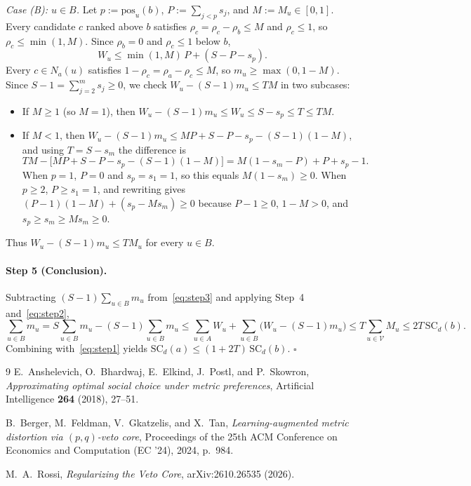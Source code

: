 \documentclass[11pt]{article}
\newcommand{\SC}{\mathrm{SC}}
\newcommand{\pos}{\mathrm{pos}}
\begin{document}
\emph{Case (B): $u \in B$.} Let $p := \pos_u(b)$, $P := \sum_{j < p} s_j$, and $M := M_u \in [0, 1]$. Every candidate $c$ ranked above $b$ satisfies $\rho_c = \rho_c - \rho_b \le M$ and $\rho_c \le 1$, so $\rho_c \le \min(1, M)$. Since $\rho_b = 0$ and $\rho_c \le 1$ below $b$,
\[
W_u \le \min(1, M)\,P + (S - P - s_p).
\]
Every $c \in N_a(u)$ satisfies $1 - \rho_c = \rho_a - \rho_c \le M$, so $m_u \ge \max(0, 1 - M)$. Since $S - 1 = \sum_{j=2}^m s_j \ge 0$, we check $W_u - (S - 1)m_u \le TM$ in two subcases:
\begin{itemize}
\item If $M \ge 1$ (so $M = 1$), then $W_u - (S - 1)m_u \le W_u \le S - s_p \le T \le TM$.
\item If $M < 1$, then $W_u - (S - 1)m_u \le MP + S - P - s_p - (S - 1)(1 - M)$, and using $T = S - s_m$ the difference is
\[
TM - \bigl[MP + S - P - s_p - (S - 1)(1 - M)\bigr] = M(1 - s_m - P) + P + s_p - 1.
\]
When $p = 1$, $P = 0$ and $s_p = s_1 = 1$, so this equals $M(1 - s_m) \ge 0$. When $p \ge 2$, $P \ge s_1 = 1$, and rewriting gives $(P - 1)(1 - M) + (s_p - Ms_m) \ge 0$ because $P - 1 \ge 0$, $1 - M > 0$, and $s_p \ge s_m \ge Ms_m \ge 0$.
\end{itemize}
Thus $W_u - (S - 1)m_u \le TM_u$ for every $u \in B$.

\paragraph{Step 5 (Conclusion).}
Subtracting $(S - 1)\sum_{u \in B} m_u$ from~\eqref{eq:step3} and applying Step~4 and~\eqref{eq:step2},
\[
\sum_{u \in B} m_u = S\sum_{u \in B} m_u - (S - 1)\sum_{u \in B} m_u
\le \sum_{u \in A} W_u + \sum_{u \in B}\bigl(W_u - (S - 1)m_u\bigr)
\le T \sum_{u \in \mathcal{V}} M_u
\le 2T\,\SC_d(b).
\]
Combining with~\eqref{eq:step1} yields $\SC_d(a) \le (1 + 2T)\,\SC_d(b)$. \hfill$\square$

\begin{thebibliography}{9}
E.~Anshelevich, O.~Bhardwaj, E.~Elkind, J.~Postl, and P.~Skowron,
\emph{Approximating optimal social choice under metric preferences},
Artificial Intelligence \textbf{264} (2018), 27--51.

B.~Berger, M.~Feldman, V.~Gkatzelis, and X.~Tan,
\emph{Learning-augmented metric distortion via $(p,q)$-veto core},
Proceedings of the 25th ACM Conference on Economics and Computation (EC '24), 2024, p.~984.

M.~A.~Rossi,
\emph{Regularizing the Veto Core},
arXiv:2610.26535 (2026).
\end{thebibliography}
\end{document}
